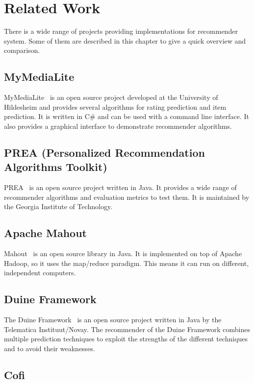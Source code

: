 
\chapter{Related Work}
\label{relatedwork}

There is a wide range of projects providing implementations for recommender
system. Some of them are described in this chapter to give a quick
overview and comparison.


\section{MyMediaLite}

MyMediaLite~\cite{Gantner2011MyMediaLite} is an open source project developed at the
University of Hildesheim and provides several algorithms for rating
prediction and item prediction. It is written in C\# and can be used with
a command line interface. It also provides a graphical interface to
demonstrate recommender algorithms.


\section{PREA (Personalized Recommendation Algorithms Toolkit)}

PREA~\cite{2012arXiv1205.3193L} is an open source project written in Java. It provides
a wide range of recommender algorithms and evaluation metrics to test
them. It is maintained by the Georgia Institute of Technology.


\section{Apache Mahout}

Mahout~\cite{mahout} is an open source library in Java. It is implemented
on top of Apache Hadoop, so it uses the map/reduce paradigm. This
means it can run on different, independent computers.


\section{Duine Framework}

The Duine Framework~\cite{duine} is an open source project written
in Java by the Telematica Instituut/Novay. The recommender of the
Duine Framework combines multiple prediction techniques to exploit
the strengths of the different techniques and to avoid their weaknesses.


\section{Cofi}

